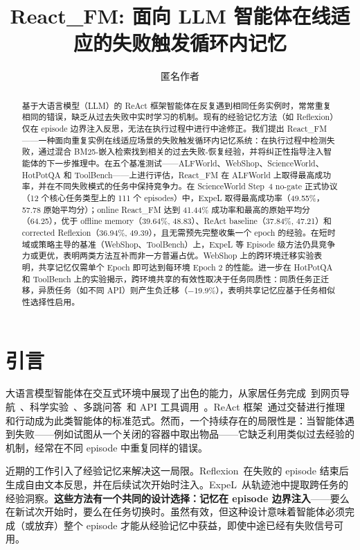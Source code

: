 \documentclass[11pt,a4paper]{article}
\title{\textbf{React\_FM: 面向 LLM 智能体在线适应的失败触发循环内记忆}}
\author{匿名作者}
\date{}
\newcommand{\method}{React\_FM}
\begin{document}
\maketitle

\begin{abstract}
基于大语言模型（LLM）的 ReAct 框架智能体在反复遇到相同任务实例时，常常重复相同的错误，缺乏从过去失败中实时学习的机制。现有的经验记忆方法（如 Reflexion）仅在 episode 边界注入反思，无法在执行过程中进行中途修正。我们提出 \method{}——一种面向重复实例在线适应场景的失败触发循环内记忆系统：在执行过程中检测失败，通过混合 BM25-嵌入检索找到相关的过去失败-恢复经验，并将纠正性指导注入智能体的下一步推理中。在五个基准测试——ALFWorld、WebShop、ScienceWorld、HotPotQA 和 ToolBench——上进行评估，\method{} 在 ALFWorld 上取得最高成功率，并在不同失败模式的任务中保持竞争力。在 ScienceWorld Step~4 no-gate 正式协议（12 个核心任务类型上的 111 个 episodes）中，ExpeL 取得最高成功率（49.55\%，57.78 原始平均分）；online \method{} 达到 41.44\% 成功率和最高的原始平均分（64.25），优于 offline memory（39.64\%, 48.83）、ReAct baseline（37.84\%, 47.21）和 corrected Reflexion（36.94\%, 49.39），且无需预先完整收集一个 epoch 的经验。在短时域或策略主导的基准（WebShop、ToolBench）上，ExpeL 等 Episode 级方法仍具竞争力或更优，表明两类方法互补而非一方普遍占优。WebShop 上的跨环境迁移实验表明，共享记忆仅需单个 Epoch 即可达到每环境 Epoch 2 的性能。进一步在 HotPotQA 和 ToolBench 上的实验揭示，跨环境共享的有效性取决于任务同质性：同质任务正迁移，异质任务（如不同 API）则产生负迁移（$-$19.9\%），表明共享记忆应基于任务相似性选择性启用。
\end{abstract}

\section{引言}

大语言模型智能体在交互式环境中展现了出色的能力，从家居任务完成~\cite{shridhar2021alfworld}到网页导航~\cite{yao2022webshop}、科学实验~\cite{wang2022scienceworld}、多跳问答~\cite{yang2018hotpotqa}和 API 工具调用~\cite{qin2023toolllm}。ReAct 框架~\cite{yao2023react}通过交替进行推理和行动成为此类智能体的标准范式。然而，一个持续存在的局限性是：当智能体遇到失败——例如试图从一个关闭的容器中取出物品——它缺乏利用类似过去经验的机制，经常在不同 episode 中重复同样的错误。

近期的工作引入了经验记忆来解决这一局限。Reflexion~\cite{shinn2023reflexion}在失败的 episode 结束后生成自由文本反思，并在后续试次开始时注入。ExpeL~\cite{zhao2024expel}从轨迹池中提取跨任务的经验洞察。\textbf{这些方法有一个共同的设计选择：记忆在 episode 边界注入}——要么在新试次开始时，要么在任务切换时。虽然有效，但这种设计意味着智能体必须完成（或放弃）整个 episode 才能从经验记忆中获益，即使中途已经有失败信号可用。
\end{document}
